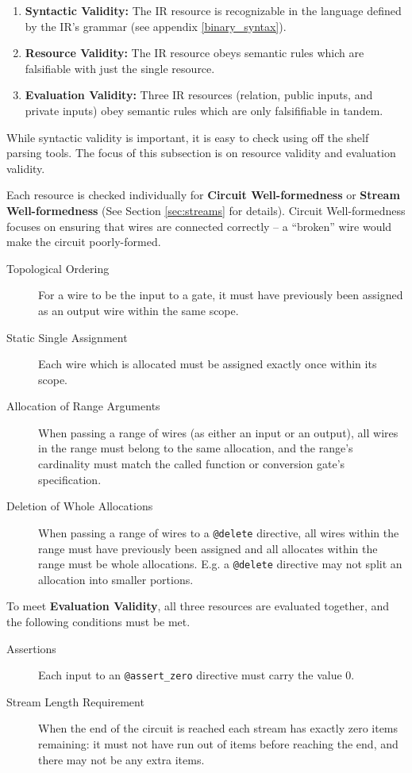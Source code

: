 \begin{enumerate}
  \item \textbf{Syntactic Validity:} The IR resource is recognizable in the language defined by the IR's grammar (see appendix \ref{binary_syntax}).
  \item \textbf{Resource Validity:} The IR resource obeys semantic rules which are falsifiable with just the single resource.
  \item \textbf{Evaluation Validity:} Three IR resources (relation, public inputs, and private inputs) obey semantic rules which are only falsififiable in tandem.
\end{enumerate}

While syntactic validity is important, it is easy to check using off the shelf parsing tools.
The focus of this subsection is on resource validity and evaluation validity.

Each resource is checked individually for \textbf{Circuit Well-formedness} or \textbf{Stream Well-formedness} (See Section \ref{sec:streams} for details).
Circuit Well-formedness focuses on ensuring that wires are connected correctly -- a ``broken'' wire would make the circuit poorly-formed.

\begin{description}
  \item[Topological Ordering] For a wire to be the input to a gate, it must have previously been assigned as an output wire within the same scope.
  \item[Static Single Assignment] Each wire which is allocated must be assigned exactly once within its scope.
  \item[Allocation of Range Arguments] When passing a range of wires (as either an input or an output), all wires in the range must belong to the same allocation, and the range's cardinality must match the called function or conversion gate's specification.
  \item[Deletion of Whole Allocations] When passing a range of wires to a \texttt{@delete} directive, all wires within the range must have previously been assigned and all allocates within the range must be whole allocations. E.g. a \texttt{@delete} directive may not split an allocation into smaller portions.
\end{description}

To meet \textbf{Evaluation Validity}, all three resources are evaluated together, and the following conditions must be met.

\begin{description}
  \item[Assertions] Each input to an \texttt{@assert\_zero} directive must carry the value $0$.
  \item[Stream Length Requirement] When the end of the circuit is reached each stream has exactly zero items remaining: it must not have run out of items before reaching the end, and there may not be any extra items.
\end{description}
